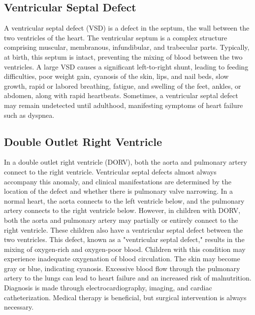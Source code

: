 \documentclass{article}
\begin{document}
\subsection{Ventricular Septal Defect}
A ventricular septal defect (VSD) is a defect in the septum, the wall between the two ventricles of the heart. The ventricular septum is a complex structure comprising muscular, membranous, infundibular, and trabecular parts. Typically, at birth, this septum is intact, preventing the mixing of blood between the two ventricles. A large VSD causes a significant left-to-right shunt, leading to feeding difficulties, poor weight gain, cyanosis of the skin, lips, and nail beds, slow growth, rapid or labored breathing, fatigue, and swelling of the feet, ankles, or abdomen, along with rapid heartbeats. Sometimes, a ventricular septal defect may remain undetected until adulthood, manifesting symptoms of heart failure such as dyspnea.

\subsection{Double Outlet Right Ventricle}
In a double outlet right ventricle (DORV), both the aorta and pulmonary artery connect to the right ventricle. Ventricular septal defects almost always accompany this anomaly, and clinical manifestations are determined by the location of the defect and whether there is pulmonary valve narrowing. In a normal heart, the aorta connects to the left ventricle below, and the pulmonary artery connects to the right ventricle below. However, in children with DORV, both the aorta and pulmonary artery may partially or entirely connect to the right ventricle. These children also have a ventricular septal defect between the two ventricles. This defect, known as a "ventricular septal defect," results in the mixing of oxygen-rich and oxygen-poor blood. Children with this condition may experience inadequate oxygenation of blood circulation. The skin may become gray or blue, indicating cyanosis. Excessive blood flow through the pulmonary artery to the lungs can lead to heart failure and an increased risk of malnutrition. Diagnosis is made through electrocardiography, imaging, and cardiac catheterization. Medical therapy is beneficial, but surgical intervention is always necessary.
\end{document}
